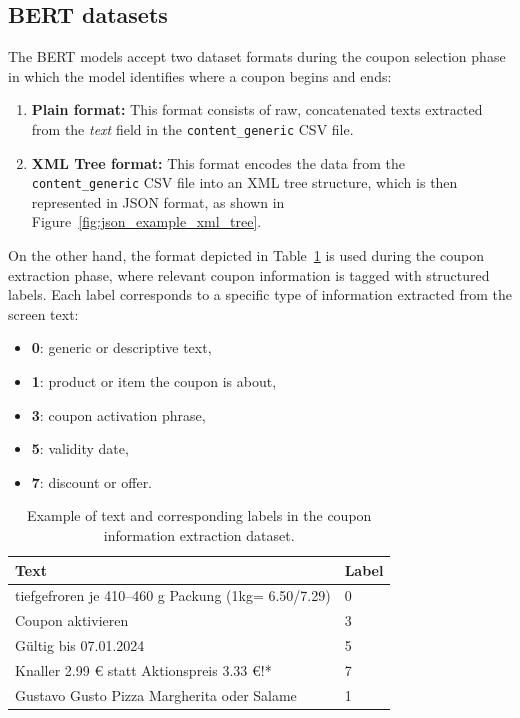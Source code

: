 \documentclass[licencjacka,en]{pracamgr}
\begin{document}
\subsection{BERT datasets}
The BERT models accept two dataset formats during the coupon selection phase in which the model identifies where a coupon begins and ends:

\begin{enumerate}
    \item \textbf{Plain format:} This format consists of raw, concatenated texts extracted from the \emph{text} field in the \texttt{content\_generic} CSV file.
    \item \textbf{XML Tree format:} This format encodes the data from the \texttt{content\_generic} CSV file into an XML tree structure, which is then represented in JSON format, as shown in Figure~\ref{fig:json_example_xml_tree}.
\end{enumerate}

On the other hand, the format depicted in Table~\ref{tab:coupon_extraction_example} is used during the coupon extraction phase, where relevant coupon information is tagged with structured labels. Each label corresponds to a specific type of information extracted from the screen text:

\begin{itemize}
    \item \textbf{0}: generic or descriptive text,
    \item \textbf{1}: product or item the coupon is about,
    \item \textbf{3}: coupon activation phrase,
    \item \textbf{5}: validity date,
    \item \textbf{7}: discount or offer.
\end{itemize}

\begin{table}[h]
\centering
\begin{tabular}{|p{8cm}|p{2cm}|}
\hline
\textbf{Text} & \textbf{Label} \\
\hline
tiefgefroren je 410--460 g Packung (1kg= 6.50/7.29) & 0 \\
\hline
Coupon aktivieren & 3 \\
\hline
Gültig bis 07.01.2024 & 5 \\
\hline
Knaller 2.99 € statt Aktionspreis 3.33 €!* & 7 \\
\hline
Gustavo Gusto Pizza Margherita oder Salame & 1 \\
\hline
\end{tabular}
\caption{Example of text and corresponding labels in the coupon information extraction dataset.}
\label{tab:coupon_extraction_example}
\end{table}
\end{document}

